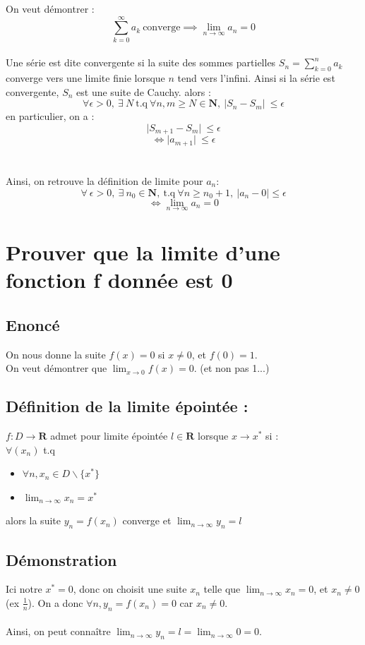 \documentclass{article}
\begin{document}
On veut démontrer :
\[ \sum_{k=0}^{\infty} a_k\ \text{converge} \implies \lim_{n\to\infty} a_n = 0 \]\\
Une série est dite convergente si la suite des sommes partielles $S_n = \sum_{k=0}^{n} a_k$ converge vers une limite finie lorsque $n$ tend vers l'infini. Ainsi si la série est convergente, $ S_n $ est une suite de Cauchy.
alors :
\[ \forall \epsilon > 0,\ \exists\ N\ \text{t.q}\ \forall n, m \geq N \in \mathbf{N},\ \lvert S_n - S_m \lvert\ \leq \epsilon \]
en particulier, on a :
\[ \lvert S_{m+1} - S_m \lvert\ \leq \epsilon \]
\[ \Leftrightarrow \lvert a_{m+1} \lvert\ \leq \epsilon \]\\\\
Ainsi, on retrouve la définition de limite pour $ a_n $:\\
\[ \forall\ \epsilon > 0,\ \exists\ n_0 \in \mathbf{N},\ \text{t.q}\ \forall n \geq n_0 + 1,\ |a_n - 0| \leq \epsilon \]
\[ \Leftrightarrow \lim_{n\to\infty} a_n = 0 \]

\newpage

\section{Prouver que la limite d'une fonction f donnée est 0}

\subsection{Enoncé}
On nous donne la suite $ f(x) = 0 $ si $ x \neq 0 $, et $ f(0) = 1 $.\\
On veut démontrer que $ \lim_{x\to{0}} f(x) = 0 $. (et non pas 1...)
\subsection{Définition de la limite épointée :}
$ f : D \to \mathbf{R} $ admet pour limite épointée $ l \in \mathbf{R} $ lorsque $ x \to x^* $ si :\\
$ \forall (x_n) $ t.q
\begin{itemize}
    \item $\forall n, x_n \in D \backslash \{x^*\} $
    \item $ \lim_{n\to\infty} x_n = x^*$
\end{itemize}
alors la suite $ y_n = f(x_n) $ converge et $ \lim_{n\to\infty} y_n = l$

\subsection{Démonstration}
Ici notre $ x^* = 0 $, donc on choisit une suite $ x_n $ telle que $ \lim_{n\to\infty} x_n = 0$, et $ x_n \neq 0$ (ex $\frac{1}{n}$). On a donc $ \forall n, y_n = f(x_n) = 0 $ car $x_n \neq 0$.\\\\
Ainsi, on peut connaître $ \lim_{n\to\infty} y_n = l = \lim_{n\to\infty} 0 = 0$.
\end{document}
